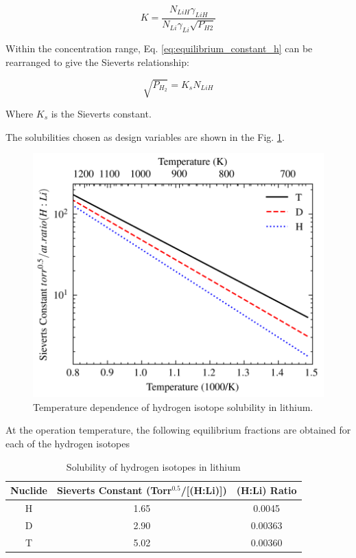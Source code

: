 \begin{equation}
K = \frac{N_{LiH} \gamma_{LiH}}{N_{Li} \gamma_{Li} \sqrt{P_{H2}}}
\label{eq:equilibrium_constant_h}
\end{equation}

Within the concentration range, Eq. \ref{eq:equilibrium_constant_h} can be rearranged to give the Sieverts relationship:

\begin{equation}
\sqrt{P_{H_2}} = K_s N_{LiH}
\end{equation}

Where $K_s$ is the Sieverts constant. 

The solubilities chosen as design variables are shown in the Fig. \ref{fig:hydrogen_solubility}.
\begin{figure}[H]
    \centering
    \includegraphics[width=0.8\linewidth]{hydrogen_solubility.png}
    \caption{Temperature dependence of hydrogen isotope solubility in lithium.}
    \label{fig:hydrogen_solubility}
\end{figure}

At the operation temperature, the following equilibrium fractions are obtained for each of the hydrogen isotopes
\begin{table}[h]
	\centering
	\begin{tabular}{|c|c|c|}
	\hline
	\textbf{Nuclide} & \textbf{Sieverts Constant (Torr$^{0.5}$/[(H:Li)])} & \textbf{(H:Li) Ratio} \\ \hline
	H & 1.65 &  0.0045 \\ \hline
	D & 2.90 &  0.00363 \\ \hline
	T & 5.02 &  0.00360 \\ \hline
	\end{tabular}
	\caption{Solubility of hydrogen isotopes in lithium}
	\label{tab:Equilibrium properties of hydrogen nuclides}
\end{table}

